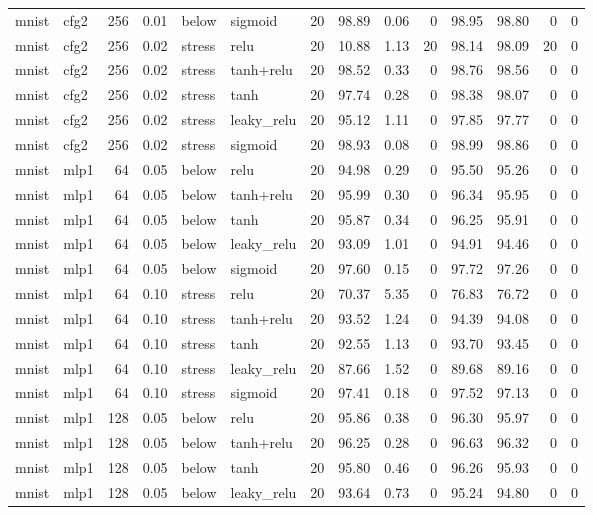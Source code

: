 \begin{table}[htbp]
{\begin{tabular}{@{}llrrllrrrrrrrr@{}}
mnist & cfg2 & 256 & 0.01 & below & sigmoid & 20 & 98.89 & 0.06 & 0 & 98.95 & 98.80 & 0 & 0 \\
mnist & cfg2 & 256 & 0.02 & stress & relu & 20 & 10.88 & 1.13 & 20 & 98.14 & 98.09 & 20 & 0 \\
mnist & cfg2 & 256 & 0.02 & stress & tanh+relu & 20 & 98.52 & 0.33 & 0 & 98.76 & 98.56 & 0 & 0 \\
mnist & cfg2 & 256 & 0.02 & stress & tanh & 20 & 97.74 & 0.28 & 0 & 98.38 & 98.07 & 0 & 0 \\
mnist & cfg2 & 256 & 0.02 & stress & leaky\_relu & 20 & 95.12 & 1.11 & 0 & 97.85 & 97.77 & 0 & 0 \\
mnist & cfg2 & 256 & 0.02 & stress & sigmoid & 20 & 98.93 & 0.08 & 0 & 98.99 & 98.86 & 0 & 0 \\
mnist & mlp1 & 64 & 0.05 & below & relu & 20 & 94.98 & 0.29 & 0 & 95.50 & 95.26 & 0 & 0 \\
mnist & mlp1 & 64 & 0.05 & below & tanh+relu & 20 & 95.99 & 0.30 & 0 & 96.34 & 95.95 & 0 & 0 \\
mnist & mlp1 & 64 & 0.05 & below & tanh & 20 & 95.87 & 0.34 & 0 & 96.25 & 95.91 & 0 & 0 \\
mnist & mlp1 & 64 & 0.05 & below & leaky\_relu & 20 & 93.09 & 1.01 & 0 & 94.91 & 94.46 & 0 & 0 \\
mnist & mlp1 & 64 & 0.05 & below & sigmoid & 20 & 97.60 & 0.15 & 0 & 97.72 & 97.26 & 0 & 0 \\
mnist & mlp1 & 64 & 0.10 & stress & relu & 20 & 70.37 & 5.35 & 0 & 76.83 & 76.72 & 0 & 0 \\
mnist & mlp1 & 64 & 0.10 & stress & tanh+relu & 20 & 93.52 & 1.24 & 0 & 94.39 & 94.08 & 0 & 0 \\
mnist & mlp1 & 64 & 0.10 & stress & tanh & 20 & 92.55 & 1.13 & 0 & 93.70 & 93.45 & 0 & 0 \\
mnist & mlp1 & 64 & 0.10 & stress & leaky\_relu & 20 & 87.66 & 1.52 & 0 & 89.68 & 89.16 & 0 & 0 \\
mnist & mlp1 & 64 & 0.10 & stress & sigmoid & 20 & 97.41 & 0.18 & 0 & 97.52 & 97.13 & 0 & 0 \\
mnist & mlp1 & 128 & 0.05 & below & relu & 20 & 95.86 & 0.38 & 0 & 96.30 & 95.97 & 0 & 0 \\
mnist & mlp1 & 128 & 0.05 & below & tanh+relu & 20 & 96.25 & 0.28 & 0 & 96.63 & 96.32 & 0 & 0 \\
mnist & mlp1 & 128 & 0.05 & below & tanh & 20 & 95.80 & 0.46 & 0 & 96.26 & 95.93 & 0 & 0 \\
mnist & mlp1 & 128 & 0.05 & below & leaky\_relu & 20 & 93.64 & 0.73 & 0 & 95.24 & 94.80 & 0 & 0 \\

\end{tabular}}
\end{table}
